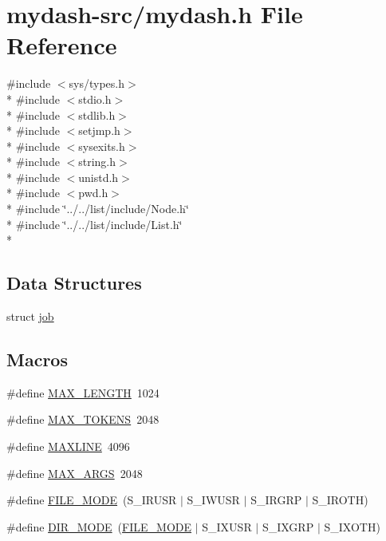 \hypertarget{mydash-src_2mydash_8h}{\section{mydash-\/src/mydash.h File Reference}
\label{mydash-src_2mydash_8h}
}
{\ttfamily \#include $<$sys/types.\-h$>$}\\*
{\ttfamily \#include $<$stdio.\-h$>$}\\*
{\ttfamily \#include $<$stdlib.\-h$>$}\\*
{\ttfamily \#include $<$setjmp.\-h$>$}\\*
{\ttfamily \#include $<$sysexits.\-h$>$}\\*
{\ttfamily \#include $<$string.\-h$>$}\\*
{\ttfamily \#include $<$unistd.\-h$>$}\\*
{\ttfamily \#include $<$pwd.\-h$>$}\\*
{\ttfamily \#include \char`\"{}../../list/include/\-Node.\-h\char`\"{}}\\*
{\ttfamily \#include \char`\"{}../../list/include/\-List.\-h\char`\"{}}\\*
\subsection*{Data Structures}
\begin{DoxyCompactItemize}
\item 
struct \hyperlink{structjob}{job}
\end{DoxyCompactItemize}
\subsection*{Macros}
\begin{DoxyCompactItemize}
\item 
\#define \hyperlink{mydash-src_2mydash_8h_a7a9a231e30b47bc0345749c8bd1e5077}{M\-A\-X\-\_\-\-L\-E\-N\-G\-T\-H}~1024
\item 
\#define \hyperlink{mydash-src_2mydash_8h_a09886d6ba96e67553bf3c49ed8ade975}{M\-A\-X\-\_\-\-T\-O\-K\-E\-N\-S}~2048
\item 
\#define \hyperlink{mydash-src_2mydash_8h_a3e937c42922f7601edb17b747602c471}{M\-A\-X\-L\-I\-N\-E}~4096
\item 
\#define \hyperlink{mydash-src_2mydash_8h_a29b7451465deac204c5f7cb1f9c6e1fc}{M\-A\-X\-\_\-\-A\-R\-G\-S}~2048
\item 
\#define \hyperlink{mydash-src_2mydash_8h_a0156511b6afae79b47bfbbe7398c0ab5}{F\-I\-L\-E\-\_\-\-M\-O\-D\-E}~(S\-\_\-\-I\-R\-U\-S\-R $|$ S\-\_\-\-I\-W\-U\-S\-R $|$ S\-\_\-\-I\-R\-G\-R\-P $|$ S\-\_\-\-I\-R\-O\-T\-H)
\item 
\#define \hyperlink{mydash-src_2mydash_8h_a2fb2887e798c593bd4528b8daad75212}{D\-I\-R\-\_\-\-M\-O\-D\-E}~(\hyperlink{p3submit_2mydash_8h_a0156511b6afae79b47bfbbe7398c0ab5}{F\-I\-L\-E\-\_\-\-M\-O\-D\-E} $|$ S\-\_\-\-I\-X\-U\-S\-R $|$ S\-\_\-\-I\-X\-G\-R\-P $|$ S\-\_\-\-I\-X\-O\-T\-H)
\end{DoxyCompactItemize}
